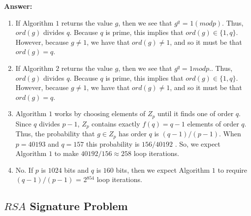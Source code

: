 \documentclass[paper=a4, fontsize=11pt]{scrartcl} %
\numberwithin{equation}{section} %
\numberwithin{figure}{section} %
\numberwithin{table}{section} %
\begin{document}
\textbf{Answer:}
\begin{enumerate}
\item If Algorithm $1$ returns the value $g$, then we see that $g^q$ = $1 (mod p)$. Thus, $ord(g)$ divides $q$. Because $q$ is prime, this implies that $ord(g) \in \{1,q\}$. However, because $g \neq  1$, we have that $ord(g) \neq 1$, and so it must be that $ord(g) = q$.
\item If Algorithm $2$ returns the value $g$, then we see that $g^q = 1 mod p$.. Thus, $ord(g)$ divides $q$. Because $q$ is prime, this implies that $ord(g) \in \{1,q\}$. However, because $g \neq 1$, we have that $ord(g) \neq 1$, and so it must be that $ord(g) = q$.
\item Algorithm $1$ works by choosing elements of $Z$$_p$ until it finds one of order $q$. Since $q$ divides $p-1$, $Z$$_p$ contains exactly $f(q) = q - 1$ elements of order $q$. Thus, the probability that $g \in Z$$_p$ has order $q$ is $(q - 1)/(p - 1)$. When $p = 40193$ and $q = 157$ this probability is $156/40192$ . So, we expect Algorithm $1$ to make $40192/156  \approx  258$ loop iterations.
\item No. If $p$ is $1024$ bits and $q$ is $160$ bits, then we expect Algorithm $1$ to require $(q-1)/(p-1)$  = 2$^{854}$  loop iterations.
\end{enumerate}

\subsection{$RSA$ Signature Problem \uppercase\expandafter{}}
\end{document}
